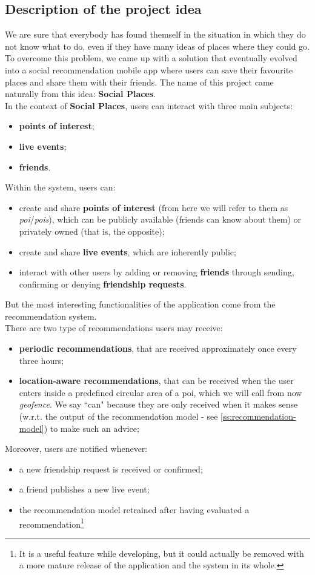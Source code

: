 \documentclass[../../main]{subfiles}
\begin{document}
\subsection{Description of the project idea}
\label{ss:description-project-idea}

We are sure that everybody has found themself in the situation in which they do not know what to do, even if they have many ideas of places where they could go.
To overcome this problem, we came up with a solution that eventually evolved into a social recommendation mobile app where users can save their favourite places and share them with their friends.
The name of this project came naturally from this idea: \textbf{Social Places}.\\
In the context of \textbf{Social Places}, users can interact with three main subjects:
\begin{itemize}
    \item \textbf{points of interest};
    \item \textbf{live events};
    \item \textbf{friends}.
\end{itemize}
Within the system, users can:
\begin{itemize}
    \item create and share \textbf{points of interest} (from here we will refer to them as \textit{poi}/\textit{pois}), which can be publicly available (friends can know about them) or privately owned (that is, the opposite);
    \item create and share \textbf{live events}, which are inherently public;
    \item interact with other users by adding or removing \textbf{friends} through sending, confirming or denying \textbf{friendship requests}.
\end{itemize}
But the most interesting functionalities of the application come from the recommendation system.\\
There are two type of recommendations users may receive:
\begin{itemize}
    \item \textbf{periodic recommendations}, that are received approximately once every three hours;
    \item \textbf{location-aware recommendations}, that can be received when the user enters inside a predefined circular area of a poi, which we will call from now \textit{geofence}.
    We say ``can" because they are only received when it makes sense (w.r.t. the output of the recommendation model - see \ref{ss:recommendation-model}) to make such an advice;
\end{itemize}
Moreover, users are notified whenever:
\begin{itemize}
    \item a new friendship request is received or confirmed;
    \item a friend publishes a new live event;
    \item the recommendation model retrained after having evaluated a recommendation\footnote{It is a useful feature while developing, but it could actually be removed with a more mature release of the application and the system in its whole.}
\end{itemize}
\end{document}

